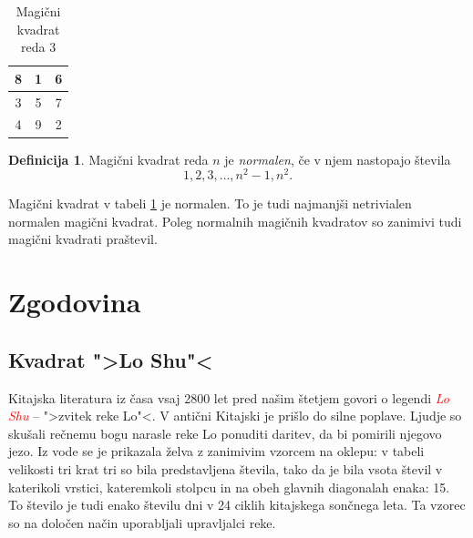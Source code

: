 \documentclass[a4paper,12pt]{article}
\theoremstyle{plain}
\theoremstyle{definition}
\newtheorem{definition}{Definicija}
\begin{document}
\begin{table}[h!]
   \centering
   \caption{Magični kvadrat reda 3}
   \label{table:mg3}
   \begin{tabular}{|c|c|c|}
      \hline
      8 & 1 & 6 \\\hline
      3 & 5 & 7 \\\hline
      4 & 9 & 2 \\\hline
      \end{tabular}

\end{table}

\begin{definition}
   Magični kvadrat reda $n$ je \textcolor{Mahogany}{\emph{normalen}}, če v njem nastopajo števila
   \begin{equation}
      \label{eq:numbers}
      1, 2, 3, \ldots, n^2-1, n^2.
   \end{equation}
\end{definition}

Magični kvadrat v tabeli \ref{table:mg3} je normalen.
To je tudi najmanjši netrivialen normalen magični kvadrat.
Poleg normalnih magičnih kvadratov so zanimivi tudi magični kvadrati praštevil.


\section{Zgodovina}

\subsection{Kvadrat ">Lo Shu"<}

Kitajska literatura iz časa vsaj 2800 let pred našim štetjem govori o legendi
\textcolor{red}{\emph{Lo Shu}} -- ">zvitek reke Lo"<. V antični Kitajski je prišlo do
silne poplave. Ljudje so skušali rečnemu bogu narasle reke Lo ponuditi daritev,
da bi pomirili njegovo jezo. Iz vode se je prikazala želva z zanimivim vzorcem
na oklepu: v tabeli velikosti tri krat tri so bila predstavljena števila, tako
da je bila vsota števil v katerikoli vrstici, kateremkoli stolpcu in na obeh
glavnih diagonalah enaka: 15. To število je tudi enako številu dni v 24 ciklih
kitajskega sončnega leta. Ta vzorec so na določen način uporabljali upravljalci
reke.
\end{document}
